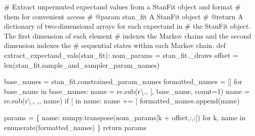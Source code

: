 \documentclass[
  letterpaper,
  DIV=11,
  numbers=noendperiod]{scrartcl}
\newenvironment{Shaded}{\begin{snugshade}}{\end{snugshade}}
\newcommand{\BuiltInTok}[1]{\textcolor[rgb]{0.00,0.23,0.31}{#1}}
\newcommand{\CommentTok}[1]{\textcolor[rgb]{0.37,0.37,0.37}{#1}}
\newcommand{\ControlFlowTok}[1]{\textcolor[rgb]{0.00,0.23,0.31}{#1}}
\newcommand{\DecValTok}[1]{\textcolor[rgb]{0.68,0.00,0.00}{#1}}
\newcommand{\KeywordTok}[1]{\textcolor[rgb]{0.00,0.23,0.31}{#1}}
\newcommand{\NormalTok}[1]{\textcolor[rgb]{0.00,0.23,0.31}{#1}}
\newcommand{\OperatorTok}[1]{\textcolor[rgb]{0.37,0.37,0.37}{#1}}
\newcommand{\StringTok}[1]{\textcolor[rgb]{0.13,0.47,0.30}{#1}}
\newcommand{\VerbatimStringTok}[1]{\textcolor[rgb]{0.13,0.47,0.30}{#1}}
\begin{document}
\begin{Shaded}
\begin{Highlighting}[]
\CommentTok{\# Extract unpermuted expectand values from a StanFit object and format}
\CommentTok{\# them for convenient access}
\CommentTok{\# @param stan\_fit A StanFit object}
\CommentTok{\# @return A dictionary of two{-}dimensional arrays for each expectand in}
\CommentTok{\#         the StanFit object.  The first dimension of each element}
\CommentTok{\#         indexes the Markov chains and the second dimension indexes the}
\CommentTok{\#         sequential states within each Markov chain.}
\KeywordTok{def}\NormalTok{ extract\_expectand\_vals(stan\_fit):}
\NormalTok{  nom\_params }\OperatorTok{=}\NormalTok{ stan\_fit.\_draws}
\NormalTok{  offset }\OperatorTok{=} \BuiltInTok{len}\NormalTok{(stan\_fit.sample\_and\_sampler\_param\_names)}
  
\NormalTok{  base\_names }\OperatorTok{=}\NormalTok{ stan\_fit.constrained\_param\_names}
\NormalTok{  formatted\_names }\OperatorTok{=}\NormalTok{ []}
  \ControlFlowTok{for}\NormalTok{ base\_name }\KeywordTok{in}\NormalTok{ base\_names:}
\NormalTok{    name }\OperatorTok{=}\NormalTok{ re.sub(}\VerbatimStringTok{r\textquotesingle{}\textbackslash{}.\textquotesingle{}}\NormalTok{, }\StringTok{\textquotesingle{}[\textquotesingle{}}\NormalTok{, base\_name, count}\OperatorTok{=}\DecValTok{1}\NormalTok{)}
\NormalTok{    name }\OperatorTok{=}\NormalTok{ re.sub(}\VerbatimStringTok{r\textquotesingle{}\textbackslash{}.\textquotesingle{}}\NormalTok{, }\StringTok{\textquotesingle{},\textquotesingle{}}\NormalTok{, name)}
    \ControlFlowTok{if} \StringTok{\textquotesingle{}[\textquotesingle{}} \KeywordTok{in}\NormalTok{ name:}
\NormalTok{      name }\OperatorTok{+=} \StringTok{\textquotesingle{}]\textquotesingle{}}
\NormalTok{    formatted\_names.append(name)}

\NormalTok{  params }\OperatorTok{=}\NormalTok{ \{ name: numpy.transpose(nom\_params[k }\OperatorTok{+}\NormalTok{ offset,:,:])}
             \ControlFlowTok{for}\NormalTok{ k, name }\KeywordTok{in} \BuiltInTok{enumerate}\NormalTok{(formatted\_names) \}}
  \ControlFlowTok{return}\NormalTok{ params}
\end{Highlighting}
\end{Shaded}
\end{document}
